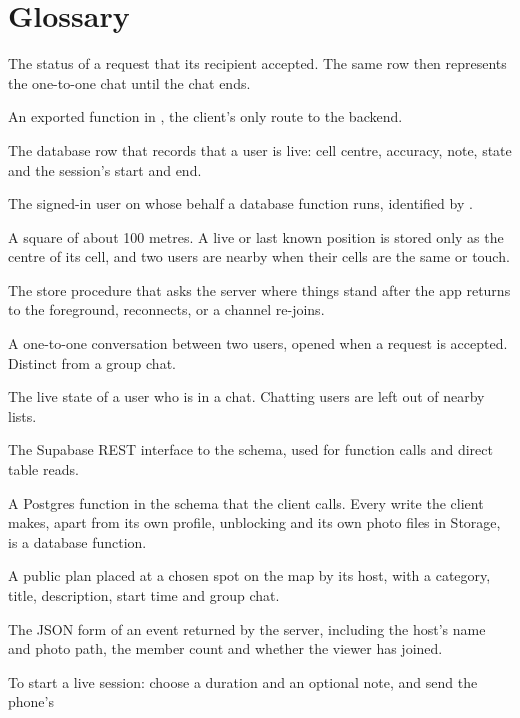 \chapter{Glossary}
\label{ch:glossary}

\begin{description}[itemsep=4pt]
  \item[Accepted] The status of a request that its recipient accepted. The same row then represents the
    one-to-one chat until the chat ends.
  \item[API function] An exported function in , the client's only route to the
    backend.
  \item[Availability] The database row that records that a user is live: cell centre, accuracy, note, state
    and the session's start and end.
  \item[Caller] The signed-in user on whose behalf a database function runs, identified by
    .
  \item[Cell] A square of about 100 metres. A live or last known position is stored only as the centre of its
    cell, and two users are nearby when their cells are the same or touch.
  \item[Catch-up] The store procedure that asks the server where things stand after the app returns to the
    foreground, reconnects, or a channel re-joins.
  \item[Chat] A one-to-one conversation between two users, opened when a request is accepted. Distinct from
    a group chat.
  \item[Chatting] The live state of a user who is in a chat. Chatting users are left out of nearby lists.
  \item[Data API] The Supabase REST interface to the  schema, used for function calls and
    direct table reads.
  \item[Database function] A Postgres function in the  schema that the client calls. Every
    write the client makes, apart from its own profile, unblocking and its own photo files in Storage, is
    a database function.
  \item[Event] A public plan placed at a chosen spot on the map by its host, with a category, title,
    description, start time and group chat.
  \item[Event card] The JSON form of an event returned by the server, including the host's name and photo
    path, the member count and whether the viewer has joined.
  \item[Go live] To start a live session: choose a duration and an optional note, and send the phone's

\end{description}
